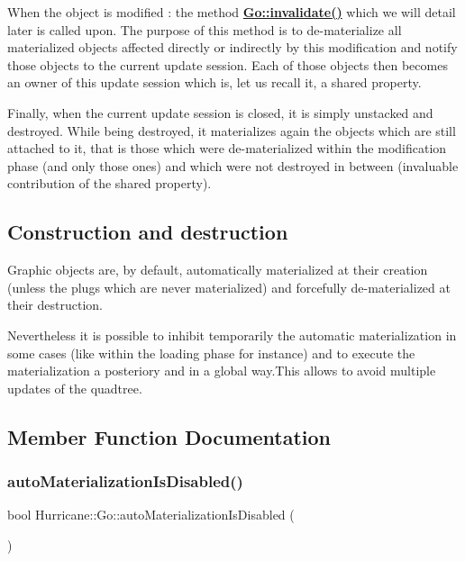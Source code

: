 When the object is modified \+: the method {\bfseries \hyperlink{classHurricane_1_1Go_a5ee451e118fe8cace16989c0f3a6d855}{Go\+::invalidate()}} which we will detail later is called upon. The purpose of this method is to de-\/materialize all materialized objects affected directly or indirectly by this modification and notify those objects to the current update session. Each of those objects then becomes an owner of this update session which is, let us recall it, a shared property.

Finally, when the current update session is closed, it is simply unstacked and destroyed. While being destroyed, it materializes again the objects which are still attached to it, that is those which were de-\/materialized within the modification phase (and only those ones) and which were not destroyed in between (invaluable contribution of the shared property).\hypertarget{classHurricane_1_1Go_secGoConstructionAndDestruction}{}\subsection{Construction and destruction}\label{classHurricane_1_1Go_secGoConstructionAndDestruction}
Graphic objects are, by default, automatically materialized at their creation (unless the plugs which are never materialized) and forcefully de-\/materialized at their destruction.

Nevertheless it is possible to inhibit temporarily the automatic materialization in some cases (like within the loading phase for instance) and to execute the materialization a posteriory and in a global way.\+This allows to avoid multiple updates of the quadtree. 

\subsection{Member Function Documentation}
\mbox{\label{classHurricane_1_1Go_a1057be4198a7b64c32a2ac3c7d560014}} 
\subsubsection{\texorpdfstring{auto\+Materialization\+Is\+Disabled()}{autoMaterializationIsDisabled()}}
{\footnotesize\ttfamily bool Hurricane\+::\+Go\+::auto\+Materialization\+Is\+Disabled (\begin{DoxyParamCaption}{ }\end{DoxyParamCaption})\hspace{0.3cm}{\ttfamily [static]}}

